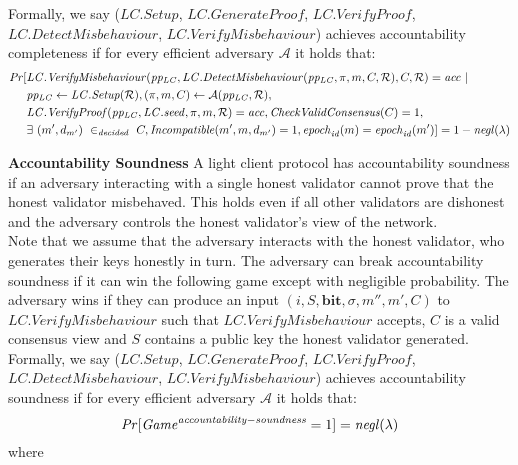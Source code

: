 \noindent Formally, we say ($\mathit{LC.Setup}$, $\mathit{LC.GenerateProof}$, 
$\mathit{LC.VerifyProof}$, \\ $\mathit{LC.DetectMisbehaviour}$, $\mathit{LC.VerifyMisbehaviour}$) 
achieves accountability completeness if for every efficient adversary $\mathcal{A}$ it holds that:
\begin{align*}
\mathit{Pr}[& \mathit{LC.VerifyMisbehaviour}(\mathit{pp_{\mathit{LC}}}, \mathit{LC.DetectMisbehaviour}(\mathit{pp_{\mathit{LC}}}, \pi, m, C, \mathcal{R}), C, \mathcal{R}) = \mathit{acc} \ | \ \\
& \mathit{pp_{\mathit{LC}}} \leftarrow \mathit{LC.Setup}( \mathcal{R}), (\pi, m, C) \leftarrow \mathcal{A}(\mathit{pp_{\mathit{LC}}}, \mathcal{R}), \\
& \mathit{LC.VerifyProof}(\mathit{pp_{\mathit{LC}}}, \mathit{LC.seed}, \pi, m, \mathcal{R}) = \mathit{acc}, \mathit{CheckValidConsensus}(C) =1, \\
& \exists \ (m', d_{m'}) \ \in_{\mathit{decided}} \ C, \mathit{Incompatible}(m', m, d_{m'})=1, \mathit{epoch}_{\mathit{id}}(m) = \mathit{epoch}_{\mathit{id}}(m')] = 1 - \mathit{negl}(\lambda)
\end{align*}

\noindent \textbf{Accountability Soundness} A light client protocol has accountability soundness if an adversary interacting with 
a single honest validator cannot prove that the honest validator misbehaved. This holds even if all other validators are dishonest and the adversary controls the honest validator's view of the network.\\

\noindent Note that we assume that the adversary interacts with the honest validator, who generates their keys honestly in turn. The adversary can break accountability soundness if it can win the following game except with negligible probability. The adversary wins if they can produce an input $(i, S, \mathbf{bit}, \sigma, m'', m', C)$ to $\mathit{LC.VerifyMisbehaviour}$ such that $\mathit{LC.VerifyMisbehaviour}$ accepts, $C$ is a valid consensus view and $S$ contains a public key the honest validator generated.\\

\noindent Formally, we say ($\mathit{LC.Setup}$, $\mathit{LC.GenerateProof}$, 
$\mathit{LC.VerifyProof}$, \\ $\mathit{LC.DetectMisbehaviour}$, $\mathit{LC.VerifyMisbehaviour}$) 
achieves accountability soundness if for every efficient adversary $\mathcal{A}$ it holds that:
$$\mathit{Pr}[\mathit{Game}^{\mathit{accountability-soundness}}=1]=\mathit{negl}(\lambda)$$
where

